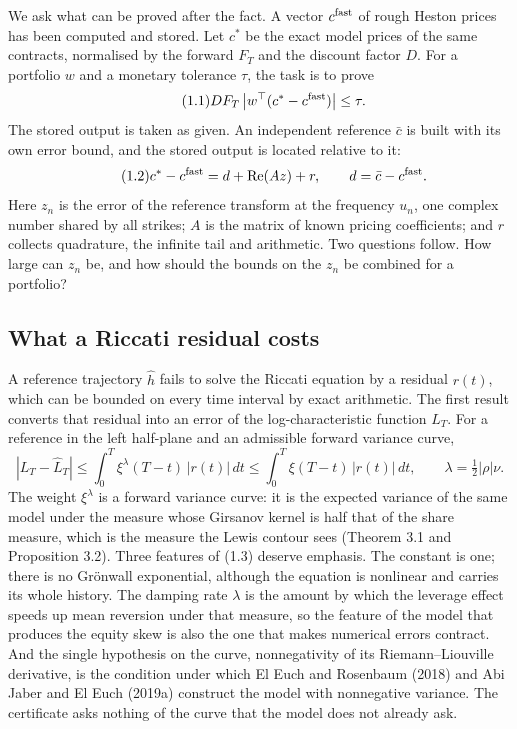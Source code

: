 \documentclass[11pt,a4paper]{article}
\begin{document}
We ask what can be proved after the fact. A vector \(c^{\rm fast}\) of rough Heston prices has been computed and stored. Let \(c^*\) be the exact model prices of the same contracts, normalised by the forward \(F_T\) and the discount factor \(D\). For a portfolio \(w\) and a monetary tolerance \(\tau\), the task is to prove
\begin{equation*}\tag{1.1}
DF_T\left|w^\top(c^*-c^{\rm fast})\right|\le\tau.
\end{equation*}
The stored output is taken as given. An independent reference \(\bar c\) is built with its own error bound, and the stored output is located relative to it:
\begin{equation*}\tag{1.2}
c^*-c^{\rm fast}=d+\operatorname{Re}(Az)+r,\qquad d=\bar c-c^{\rm fast}.
\end{equation*}
Here \(z_n\) is the error of the reference transform at the frequency \(u_n\), one complex number shared by all strikes; \(A\) is the matrix of known pricing coefficients; and \(r\) collects quadrature, the infinite tail and arithmetic. Two questions follow. How large can \(z_n\) be, and how should the bounds on the \(z_n\) be combined for a portfolio?

\setcounter{subsection}{0}\subsection{What a Riccati residual costs}

A reference trajectory \(\widehat h\) fails to solve the Riccati equation by a residual \(r(t)\), which can be bounded on every time interval by exact arithmetic. The first result converts that residual into an error of the log-characteristic function \(L_T\). For a reference in the left half-plane and an admissible forward variance curve,
\begin{equation*}\tag{1.3}
\left|L_T-\widehat L_T\right|\le\int_0^T\xi^{\lambda}(T-t)\,|r(t)|\,dt\le\int_0^T\xi(T-t)\,|r(t)|\,dt,
\qquad \lambda=\tfrac12|\rho|\nu .
\end{equation*}
The weight \(\xi^\lambda\) is a forward variance curve: it is the expected variance of the same model under the measure whose Girsanov kernel is half that of the share measure, which is the measure the Lewis contour sees (Theorem 3.1 and Proposition 3.2). Three features of (1.3) deserve emphasis. The constant is one; there is no Grönwall exponential, although the equation is nonlinear and carries its whole history. The damping rate \(\lambda\) is the amount by which the leverage effect speeds up mean reversion under that measure, so the feature of the model that produces the equity skew is also the one that makes numerical errors contract. And the single hypothesis on the curve, nonnegativity of its Riemann–Liouville derivative, is the condition under which El Euch and Rosenbaum (2018) and Abi Jaber and El Euch (2019a) construct the model with nonnegative variance. The certificate asks nothing of the curve that the model does not already ask.
\end{document}
